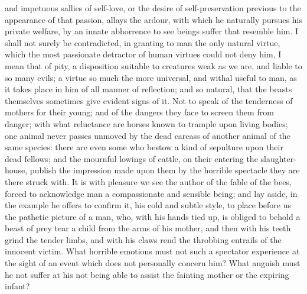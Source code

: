 \documentclass[11pt,twocolumn]{ltugboat}
\begin{document}
and impetuous sallies of self-love, or the desire of self-preservation
previous to the appearance of that passion, allays the ardour, with
which he naturally pursues his private welfare, by an innate
abhorrence to see beings suffer that resemble him. I shall not surely
be contradicted, in granting to man the only natural virtue, which the
most passionate detractor of human virtues could not deny him, I mean
that of pity, a disposition suitable to creatures weak as we are, and
liable to so many evils; a virtue so much the more universal, and
withal useful to man, as it takes place in him of all manner of
reflection; and so natural, that the beasts themselves sometimes give
evident signs of it. Not to speak of the tenderness of mothers for
their young; and of the dangers they face to screen them from danger;
with what reluctance are horses known to trample upon living bodies;
one animal never passes unmoved by the dead carcass of another animal
of the same species: there are even some who bestow a kind of
sepulture upon their dead fellows; and the mournful lowings of cattle,
on their entering the slaughter-house, publish the impression made
upon them by the horrible spectacle they are there struck with. It is
with pleasure we see the author of the fable of the bees, forced to
acknowledge man a compassionate and sensible being; and lay aside, in
the example he offers to confirm it, his cold and subtle style, to
place before us the pathetic picture of a man, who, with his hands
tied up, is obliged to behold a beast of prey tear a child from the
arms of his mother, and then with his teeth grind the tender limbs,
and with his claws rend the throbbing entrails of the innocent victim.
What horrible emotions must not such a spectator experience at the
sight of an event which does not personally concern him? What anguish
must he not suffer at his not being able to assist the fainting mother
or the expiring infant?
\end{document}
